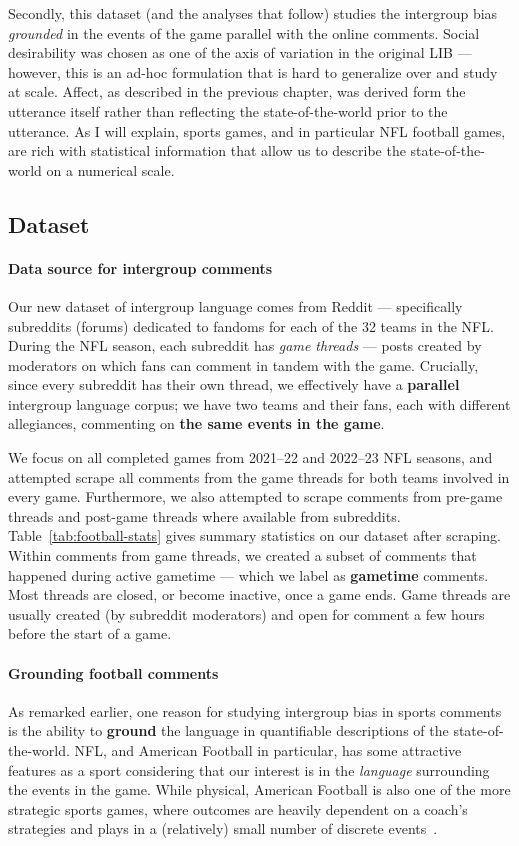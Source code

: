 Secondly, this dataset (and the analyses that follow) studies the intergroup bias \emph{grounded} in the events of the game parallel with the online comments. Social desirability was chosen as one of the axis of variation in the original LIB --- however, this is an ad-hoc formulation that is hard to generalize over and study at scale. Affect, as described in the previous chapter, was derived form the utterance itself rather than reflecting the state-of-the-world prior to the utterance. As I will explain, sports games, and in particular NFL football games, are rich with statistical information that allow us to describe the state-of-the-world on a numerical scale.

\subsection{Dataset} 

\paragraph{Data source for intergroup comments} Our new dataset of intergroup language comes from Reddit --- specifically subreddits (forums) dedicated to fandoms for each of the 32 teams in the NFL. During the NFL season, each subreddit has \emph{game threads} --- posts created by moderators on which fans can comment in tandem with the game. Crucially, since every subreddit has their own thread, we effectively have a \textbf{parallel} intergroup language corpus; we have two teams and their fans, each with different allegiances, commenting on \textbf{the same events in the game}. 

We focus on all completed games from 2021--22 and 2022--23 NFL seasons, and attempted scrape all comments from the game threads for both teams involved in every game. Furthermore, we also attempted to scrape comments from pre-game threads and post-game threads where available from subreddits. Table~\ref{tab:football-stats} gives summary statistics on our dataset after scraping. Within comments from game threads, we created a subset of comments that happened during active gametime --- which we label as \textbf{gametime} comments. Most threads are closed, or become inactive, once a game ends. Game threads are usually created (by subreddit moderators) and open for comment a few hours before the start of a game.



\paragraph{Grounding football comments} As remarked earlier, one reason for studying intergroup bias in sports comments is the ability to \textbf{ground} the language in quantifiable descriptions of the state-of-the-world. NFL, and American Football in particular, has some attractive features as a sport considering that our interest is in the \emph{language} surrounding the events in the game. While physical, American Football is also one of the more strategic sports games, where outcomes are heavily dependent on a coach's strategies and plays in a (relatively) small number of discrete events~\citep{pelechrinis2016anatomy}.

